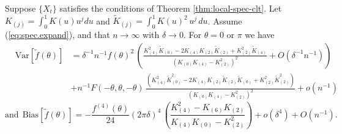 \documentclass[12p E.Lt,psfig]{article} %
\def\tends{\rightarrow}
\begin{document}
 \begin{proposition}
\label{prop:wls-spec-biasandvar}
      Suppose $\{ X_t \}$ %
satisfies the conditions of Theorem \ref{thm:local-spec-clt}.
        Let $K_{(j)} = \int_0^1 K (  u) u^j du$ and
    $\widetilde{K}_{(j)} = \int_0^1 { K(u)}^2 \, u^j \, du$.   Assume (\ref{eq:spec.expand}), and that $n \tends \infty$ with $\delta \tends 0$.   
  For $\theta = 0 $ or $ \pi$ we have
 \begin{eqnarray*}
 & \mbox{Var} [ \tilde{f} (\theta) ] & =  \delta^{-1} n^{-1}   {f( \theta)}^2 \, \left(
    \frac{  K^2_{(4)} \widetilde{K}_{(0)}  - 2   K_{(4)} K_{(2)} \widetilde{K}_{(2)} +
     K_{(2)}^2 \widetilde{K}_{(4)}  }{ {(K_{(0)} K_{(4)} - K_{(2)}^2 )}^2 }  + O(\delta^{-1} n^{-1}) \right) \\
&   & +  n^{-1}  F(-\theta, \theta, -\theta) \,   \frac{ \left( K_{(4)}^2 \widetilde{K}_{(0)}^2  -
 	 2 K_{(4)} K_{(2)} \widetilde{K}_{(2)} \widetilde{K}_{(0)} + K_{(2)}^2 \widetilde{K}_{(2)}^2 \right) }{
 	  {(K_{(0)} K_{(4)} - K_{(2)}^2 )}^2 }    + o(n^{-1})
  \end{eqnarray*}
\[
\mbox{and} \ \   \mbox{Bias} [ \tilde{f} (\theta) ]  =  -  \frac{   f^{(4)} (\theta) }{ 24}  {( 2 \pi \delta)}^4
    \,  \left( \frac{ K_{(4)}^2 - K_{(6)} K_{(2)} }{ K_{(4)} K_{(0)} - K_{(2)}^2 } \right)   + o(\delta^4) +  O(n^{-1}).
  \]
\end{proposition}
\end{document}

